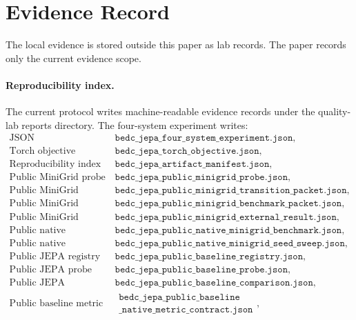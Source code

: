 \section{Evidence Record}
\label{sec:evidence-packet}

The local evidence is stored outside this paper as lab records.  The paper
records only the current evidence scope.

\paragraph{Reproducibility index.}
The current protocol writes machine-readable evidence records under the quality-lab
reports directory.  The four-system experiment writes:
{\footnotesize
$$
\begin{array}{ll}
\text{JSON} & \texttt{bedc\_jepa\_four\_system\_experiment.json},\\
\text{Torch objective} & \texttt{bedc\_jepa\_torch\_objective.json},\\
\text{Reproducibility index} & \texttt{bedc\_jepa\_artifact\_manifest.json},\\
\text{Public MiniGrid probe} & \texttt{bedc\_jepa\_public\_minigrid\_probe.json},\\
\text{Public MiniGrid transition} & \texttt{bedc\_jepa\_public\_minigrid\_transition\_packet.json},\\
\text{Public MiniGrid benchmark} & \texttt{bedc\_jepa\_public\_minigrid\_benchmark\_packet.json},\\
\text{Public MiniGrid external result} & \texttt{bedc\_jepa\_public\_minigrid\_external\_result.json},\\
\text{Public native MiniGrid benchmark} & \texttt{bedc\_jepa\_public\_native\_minigrid\_benchmark.json},\\
\text{Public native MiniGrid seed sweep} & \texttt{bedc\_jepa\_public\_native\_minigrid\_seed\_sweep.json},\\
\text{Public JEPA registry} & \texttt{bedc\_jepa\_public\_baseline\_registry.json},\\
\text{Public JEPA probe} & \texttt{bedc\_jepa\_public\_baseline\_probe.json},\\
\text{Public JEPA comparison} & \texttt{bedc\_jepa\_public\_baseline\_comparison.json},\\
\text{Public baseline metric contract} &
\begin{array}{l}\texttt{bedc\_jepa\_public\_baseline}\\\texttt{\_native\_metric\_contract.json}\end{array},\\

\end{array}$$}

